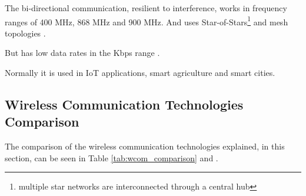 The bi-directional communication, resilient to interference, works in frequency ranges of 400 MHz, 868 MHz and 900 MHz.
And uses Star-of-Stars\footnote{multiple star networks are interconnected through a central hub} \cite{WCOM10} and mesh topologies \cite{WCOM9}.

But has low data rates in the Kbps range \cite{WCOM8}.

Normally it is used in \gls{IoT} applications, smart agriculture and smart cities.

\subsection{Wireless Communication Technologies Comparison}
The comparison of the wireless communication technologies explained, in this section, can be seen in Table \ref{tab:wcom_comparison} \cite{WCOM11} and \cite{WCOM12}.
\begin{table}[H]
    \caption{Comparison of Communication Technologies}
    \label{tab:wcom_comparison}
\end{table}


